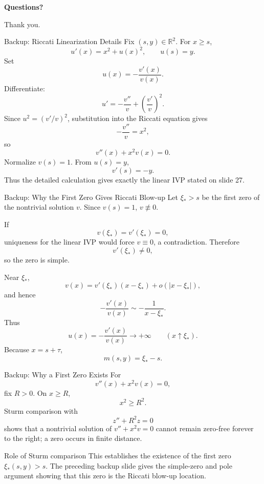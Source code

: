\documentclass[aspectratio=169,11pt]{beamer}
\newcommand{\R}{\mathbb{R}}
\begin{document}
{
\begin{frame}[plain]
\vfill
\centering
{\color{white}\Huge\bfseries Questions?\par}
\vspace{1em}
{\color{LSUGold}\Large Thank you.\par}
\vfill
\end{frame}}

\appendix

\begin{frame}{Backup: Riccati Linearization Details}
\footnotesize
Fix \((s,y)\in\R^2\). For \(x\ge s\),
\[
u'(x)=x^2+u(x)^2,\qquad u(s)=y.
\]
Set
\[
\boxed{u(x)=-\frac{v'(x)}{v(x)}}.
\]
Differentiate:
\[
u'
=
-\frac{v''}{v}
+
\left(\frac{v'}{v}\right)^2.
\]
Since \(u^2=(v'/v)^2\), substitution into the Riccati equation gives
\[
-\frac{v''}{v}=x^2,
\]
so
\[
\boxed{v''(x)+x^2v(x)=0.}
\]
Normalize \(v(s)=1\). From \(u(s)=y\),
\[
\boxed{v'(s)=-y.}
\]
Thus the detailed calculation gives exactly the linear IVP stated on slide 27.
\end{frame}

\begin{frame}{Backup: Why the First Zero Gives Riccati Blow-up}
\footnotesize
Let \(\xi_*>s\) be the first zero of the nontrivial solution \(v\). Since \(v(s)=1\), \(v\not\equiv0\).

If
\[
v(\xi_*)=v'(\xi_*)=0,
\]
uniqueness for the linear IVP would force \(v\equiv0\), a contradiction. Therefore
\[
\boxed{v'(\xi_*)\neq0,}
\]
so the zero is simple.

Near \(\xi_*\),
\[
v(x)=v'(\xi_*)(x-\xi_*)+o(|x-\xi_*|),
\]
and hence
\[
-\frac{v'(x)}{v(x)}
\sim
-\frac{1}{x-\xi_*}.
\]
Thus
\[
u(x)=-\frac{v'(x)}{v(x)}\longrightarrow+\infty
\qquad (x\uparrow\xi_*).
\]
Because \(x=s+\tau\),
\[
\boxed{m(s,y)=\xi_*-s.}
\]
\end{frame}

\begin{frame}{Backup: Why a First Zero Exists}
\footnotesize
For
\[
v''(x)+x^2v(x)=0,
\]
fix \(R>0\). On \(x\ge R\),
\[
x^2\ge R^2.
\]
Sturm comparison with
\[
z''+R^2z=0
\]
shows that a nontrivial solution of \(v''+x^2v=0\) cannot remain zero-free forever to the right; a zero occurs in finite distance.

\begin{alertblock}{Role of Sturm comparison}
This establishes the existence of the first zero \(\xi_*(s,y)>s\). The preceding backup slide gives the simple-zero and pole argument showing that this zero is the Riccati blow-up location.
\end{alertblock}
\end{frame}
\end{document}
